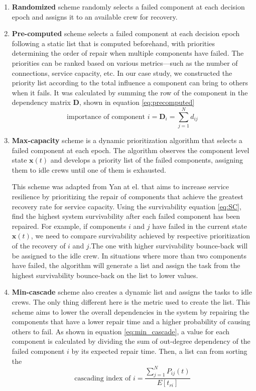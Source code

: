 \documentclass[conference]{IEEEtran}
\begin{document}
\begin{enumerate}
\item \textbf{Randomized} scheme randomly selects a failed component at each decision epoch and assigns it to an available crew for recovery. 

\item \textbf{Pre-computed} scheme selects a failed component at each decision epoch following a static list that is computed beforehand, with priorities determining the order of repair when multiple components have failed. The priorities can be ranked based on various metrics—such as the number of connections, service capacity, etc. In our case study, we constructed the priority list according to the total influence a component can bring to others when it fails. It was calculated by summing the row of the component in the dependency matrix $\mathbf{D}$, shown in equation \ref{eq:precomputed}
$$
\text{importance of component } i = \mathbf{D}_i = \sum_{j=1}^{N} d_{ij}
\label{eq:precomputed}
$$

\item \textbf{Max-capacity} scheme is a dynamic prioritization algorithm that selects a failed component at each epoch. The algorithm observes the component level state $\mathbf{x}(t)$ and develops a priority list of the failed components, assigning them to idle crews until one of them is exhausted.

This scheme was adapted from Yan at el. \cite{yan_dynamic_2021} that aims to increase service resilience by prioritizing the repair of components that achieve the greatest recovery rate for service capacity. Using the survivability equation \ref{eq:SC}, find the highest system survivability after each failed component has been repaired. 
For example, if components $i$ and $j$ have failed in the current state $\mathbf{x}(t)$, we need to compare survivability achieved by respective prioritization of the recovery of $i$ and $j$.The one with higher survivability bounce-back will be assigned to the idle crew. In situations where more than two components have failed, the algorithm will generate a list and  assign the task from the highest survivability bounce-back on the list to lower values. 

\item \textbf{Min-cascade} scheme also creates a dynamic list and assigns the tasks to idle crews. The only thing different here is the metric used to create the list. This scheme aims to lower the overall dependencies in the system by repairing the components that have a lower repair time and a higher probability of causing others to fail. As shown in equation \ref{eq:min_cascade}, a value for each component is calculated by dividing the sum of out-degree dependency of the failed component $i$ by its expected repair time. Then, a list can from sorting the 
\begin{equation}
\label{eq:min_cascade}
\text{cascading index of } i 
= \frac{\sum_{j=1}^{N} P_{ij} (t)}{E[t_{ri}]}
\end{equation}

\end{enumerate}
\end{document}

